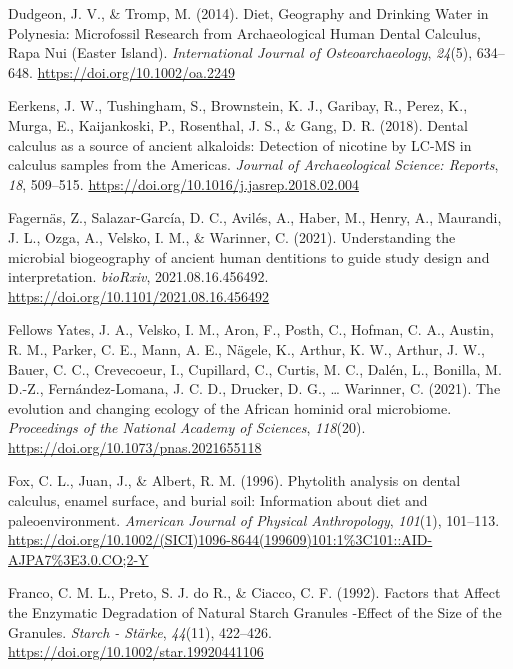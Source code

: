 \documentclass[
  letterpaper,
]{book}
\newlength{\cslhangindent}
\newlength{\cslentryspacingunit} %
\newenvironment{CSLReferences}[2] %
 {%
  \setlength{\parindent}{0pt}
  \ifodd #1
  \let\oldpar\par
  \def\par{\hangindent=\cslhangindent\oldpar}
  \fi
  \setlength{\parskip}{#2\cslentryspacingunit}
 }%
 {}
\begin{document}
\begin{CSLReferences}{1}{0}
\leavevmode{}%
Dudgeon, J. V., \& Tromp, M. (2014). Diet, {Geography} and {Drinking
Water} in {Polynesia}: {Microfossil Research} from {Archaeological Human
Dental Calculus}, {Rapa Nui} ({Easter Island}). \emph{International
Journal of Osteoarchaeology}, \emph{24}(5), 634--648.
\url{https://doi.org/10.1002/oa.2249}

\leavevmode{}%
Eerkens, J. W., Tushingham, S., Brownstein, K. J., Garibay, R., Perez,
K., Murga, E., Kaijankoski, P., Rosenthal, J. S., \& Gang, D. R. (2018).
Dental calculus as a source of ancient alkaloids: {Detection} of
nicotine by {LC-MS} in calculus samples from the {Americas}.
\emph{Journal of Archaeological Science: Reports}, \emph{18}, 509--515.
\url{https://doi.org/10.1016/j.jasrep.2018.02.004}

\leavevmode{}%
Fagernäs, Z., Salazar-García, D. C., Avilés, A., Haber, M., Henry, A.,
Maurandi, J. L., Ozga, A., Velsko, I. M., \& Warinner, C. (2021).
Understanding the microbial biogeography of ancient human dentitions to
guide study design and interpretation. \emph{bioRxiv},
2021.08.16.456492. \url{https://doi.org/10.1101/2021.08.16.456492}

\leavevmode{}%
Fellows Yates, J. A., Velsko, I. M., Aron, F., Posth, C., Hofman, C. A.,
Austin, R. M., Parker, C. E., Mann, A. E., Nägele, K., Arthur, K. W.,
Arthur, J. W., Bauer, C. C., Crevecoeur, I., Cupillard, C., Curtis, M.
C., Dalén, L., Bonilla, M. D.-Z., Fernández-Lomana, J. C. D., Drucker,
D. G., \ldots{} Warinner, C. (2021). The evolution and changing ecology
of the {African} hominid oral microbiome. \emph{Proceedings of the
National Academy of Sciences}, \emph{118}(20).
\url{https://doi.org/10.1073/pnas.2021655118}

\leavevmode{}%
Fox, C. L., Juan, J., \& Albert, R. M. (1996). Phytolith analysis on
dental calculus, enamel surface, and burial soil: {Information} about
diet and paleoenvironment. \emph{American Journal of Physical
Anthropology}, \emph{101}(1), 101--113.
\url{https://doi.org/10.1002/(SICI)1096-8644(199609)101:1\%3C101::AID-AJPA7\%3E3.0.CO;2-Y}

\leavevmode{}%
Franco, C. M. L., Preto, S. J. do R., \& Ciacco, C. F. (1992). Factors
that {Affect} the {Enzymatic Degradation} of {Natural Starch Granules}
-{Effect} of the {Size} of the {Granules}. \emph{Starch - Stärke},
\emph{44}(11), 422--426. \url{https://doi.org/10.1002/star.19920441106}


\end{CSLReferences}
\end{document}
